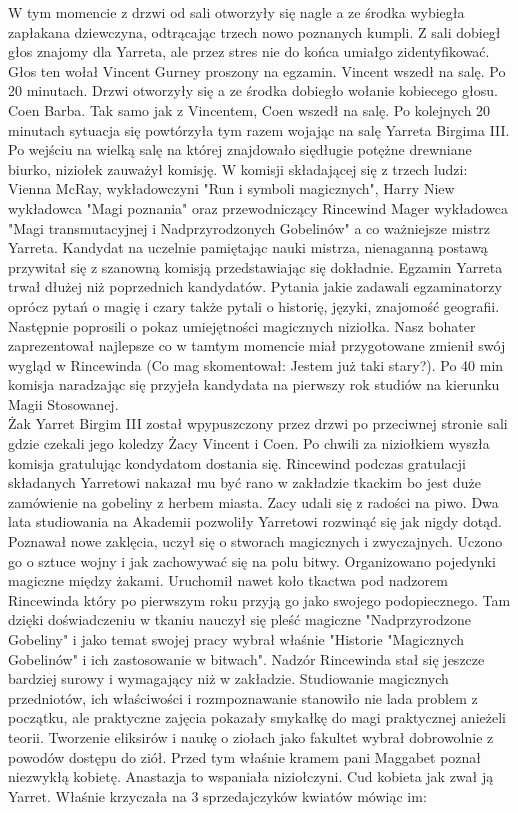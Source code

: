 \documentclass{article}
\begin{document}
    W tym momencie z drzwi od sali otworzyły się nagle a ze środka wybiegła zapłakana dziewczyna, odtrącając trzech nowo poznanych kumpli. Z sali dobiegł głos znajomy dla Yarreta, ale przez stres nie do końca umiałgo zidentyfikować. Głos ten wołał Vincent Gurney proszony na egzamin. Vincent wszedł na salę. Po 20 minutach. Drzwi otworzyły się a ze środka dobiegło wołanie kobiecego głosu. Coen Barba. Tak samo jak z Vincentem, Coen wszedł na salę. Po kolejnych 20 minutach sytuacja się powtórzyła tym razem wojając na salę Yarreta Birgima III. Po wejściu na wielką salę na której znajdowało siędługie potężne drewniane biurko, niziołek zauważył komisję. W komisji składającej się z trzech ludzi: Vienna McRay, wykładowczyni "Run i symboli magicznych", Harry Niew wykładowca "Magi poznania" oraz przewodniczący Rincewind Mager wykładowca "Magi transmutacyjnej i Nadprzyrodzonych Gobelinów" a co ważniejsze mistrz Yarreta. Kandydat na uczelnie pamiętając nauki mistrza, nienaganną postawą przywitał się z szanowną komisją przedstawiając się dokładnie. Egzamin Yarreta trwał dłużej niż poprzednich kandydatów. Pytania jakie zadawali egzaminatorzy oprócz pytań o magię i czary także pytali o historię, języki, znajomość geografii. Następnie poprosili o pokaz umiejętności magicznych niziołka. Nasz bohater zaprezentował najlepsze co w tamtym momencie miał przygotowane zmienił swój wygląd w Rincewinda (Co mag skomentował: Jestem już taki stary?). Po 40 min komisja naradzając się przyjeła kandydata na pierwszy rok studiów na kierunku Magii Stosowanej.\\

    Żak Yarret Birgim III został wpypuszczony przez drzwi po przeciwnej stronie sali gdzie czekali jego koledzy Żacy Vincent i Coen. Po chwili za niziołkiem wyszła komisja gratulując kondydatom dostania się. Rincewind podczas gratulacji składanych Yarretowi nakazał mu być rano w zakładzie tkackim bo jest duże zamówienie na gobeliny z herbem miasta. Zacy udali się z radości na piwo. Dwa lata studiowania na Akademii pozwoliły Yarretowi rozwinąć się jak nigdy dotąd. Poznawał nowe zaklęcia, uczył się o stworach magicznych i zwyczajnych. Uczono go o sztuce wojny i jak zachowywać się na polu bitwy. Organizowano pojedynki magiczne między żakami. Uruchomił nawet koło tkactwa pod nadzorem Rincewinda który po pierwszym roku przyją go jako swojego podopiecznego. Tam dzięki doświadczeniu w tkaniu nauczył się pleść magiczne "Nadprzyrodzone Gobeliny" i jako temat swojej pracy wybrał właśnie "Historie "Magicznych Gobelinów" i ich zastosowanie w bitwach". Nadzór Rincewinda stał się jeszcze bardziej surowy i wymagający niż w zakładzie. Studiowanie magicznych przedniotów, ich właściwości i rozmpoznawanie stanowiło nie lada problem z początku, ale praktyczne zajęcia pokazały smykałkę do magi praktycznej anieżeli teorii. Tworzenie eliksirów i naukę o ziołach jako fakultet wybrał dobrowolnie z powodów dostępu do ziół. Przed tym właśnie kramem pani Maggabet poznał niezwykłą kobietę. Anastazja to wspaniała niziołczyni. Cud kobieta jak zwał ją Yarret. Właśnie krzyczała na 3 sprzedajczyków kwiatów mówiąc im:\\
\end{document}
